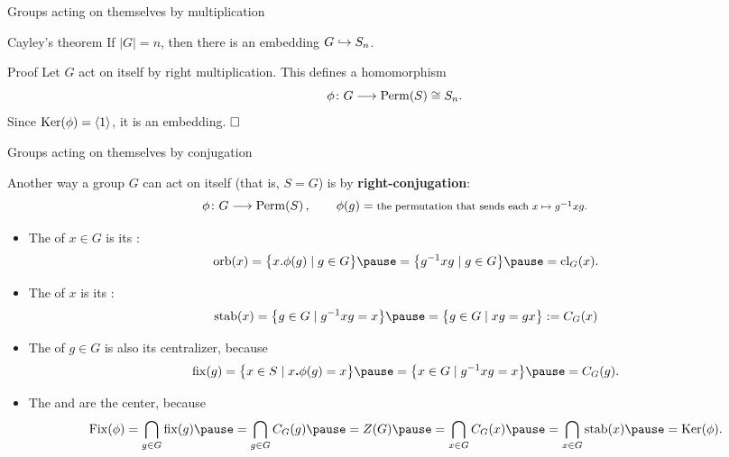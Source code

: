 \documentclass[8pt]{beamer}
\newcommand{\Pause}{\pause}      %
\begin{document}
\begin{frame}{Groups acting on themselves by multiplication}
  \vspace{-1mm}\Pause
  
  \begin{block}{Cayley's theorem}
    If $|G|=n$, then there is an embedding $G\hookrightarrow S_n$.
  \end{block}
  
  \begin{exampleblock}{Proof} \Pause
    Let $G$ act on itself by right multiplication. \Pause This defines
    a homomorphism 
    \[
    \phi\colon G\longrightarrow\operatorname{Perm}(S)\cong S_n.
    \]
    \Pause Since $\operatorname{Ker}(\phi)=\langle1\rangle$, it is an embedding. $\hfill\Box$
  \end{exampleblock}
  
\end{frame}


\begin{frame}{Groups acting on themselves by conjugation}

  Another way a group $G$ can act on itself (that is, $S=G$) is by
  \textbf{right-conjugation}:
  \[
  \phi\colon G\longrightarrow\operatorname{Perm}(S)\,,\qquad \phi(g)=\mbox{\footnotesize the
    permutation that sends each $x\mapsto g^{-1}xg$.}
  \]

  \Pause

  \begin{itemize}
  \item The  of $x\in G$ is its : %
    \[
    \orb(x)=\big\{x.\phi(g)\mid g\in G\big\}\Pause=\big\{g^{-1}xg\mid
    g\in G\big\} \Pause=\cl_G(x).
    \]
    \vspace{-3mm}\Pause
  \item The  of $x$ is its : 
    \[
    \stab(x)=\big\{g\in G\mid g^{-1}xg=x\big\}\Pause
    =\big\{g\in G\mid xg=gx\big\}:=C_G(x)
    \]
    \vspace{-3mm}\Pause
  \item The  of $g\in G$ is
    also its centralizer, because
    \[
    \fix(g)=\big\{x\in S\mid x\Dot\phi(g)=x\big\}\Pause=\big\{x\in G\mid
    g^{-1}xg=x\big\}\Pause=C_G(g).
    \]
    \vspace{-3mm}\Pause
  \item The  and  are the
    center, because
    \[
    \Fix(\phi)=\bigcap_{g\in G}\fix(g)\Pause=\bigcap_{g\in G}C_G(g)\Pause=Z(G)
    \Pause=\bigcap_{x\in G}C_G(x)\Pause=\bigcap_{x\in G}\stab(x)\Pause=\Ker(\phi).
    \]
  \end{itemize}
  
\end{frame}
\end{document}
